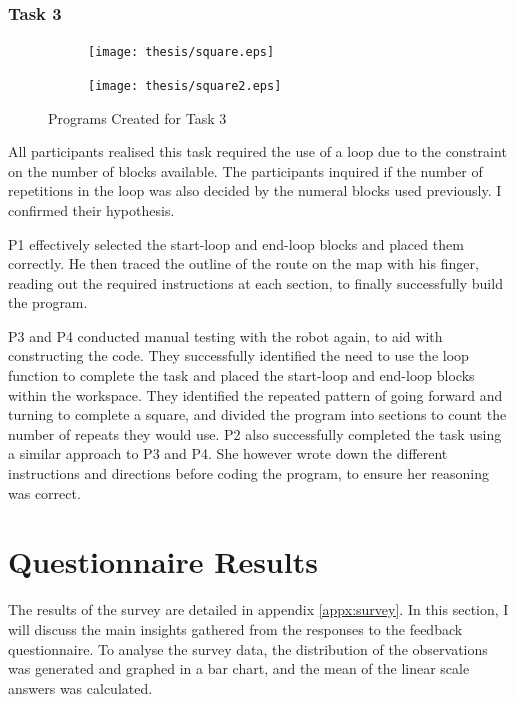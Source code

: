 \documentclass[oneside,%
                    author={Malak Hajji},
                    degree={BSc},
                    title={Designing An Accessible Computational Toolkit For Students},
                  subtitle={With Mixed Visual Abilities}]{dissertation}
\begin{document}
\subsubsection{Task 3}
\FloatBarrier

\begin{figure}[h]
\centering
\begin{subfigure}{.5\textwidth}
  \centering
  \texttt{[image: thesis/square.eps]}
  \label{fig-square}
\end{subfigure}%
\begin{subfigure}{.5\textwidth}
  \centering
  \texttt{[image: thesis/square2.eps]}
 
  \label{fig-square2}
\end{subfigure}
\caption{Programs Created for Task 3}
\label{fig-task3}
\end{figure}
\FloatBarrier
All participants realised this task required the use of a loop due to the constraint on the number of blocks available. The participants inquired if the number of repetitions in the loop was also decided by the numeral blocks used previously. I confirmed their hypothesis. 

P1 effectively selected the start-loop and end-loop blocks and placed them correctly. He then traced the outline of the route on the map with his finger, reading out the required instructions at each section, to finally successfully build the program.

P3 and P4 conducted manual testing with the robot again, to aid with constructing the code. They successfully identified the need to use the loop function to complete the task and placed the start-loop and end-loop blocks within the workspace. They identified the repeated pattern of going forward and turning to complete a square, and divided the program into sections to count the number of repeats they would use. 
P2 also successfully completed the task using a similar approach to P3 and P4. She however wrote down the different instructions and directions before coding the program, to ensure her reasoning was correct.


\section{Questionnaire Results}
The results of the survey are detailed in appendix \ref{appx:survey}. In this section, I will discuss the main insights gathered from the responses to the feedback questionnaire. To analyse the survey data, the distribution of the observations was generated and graphed in a bar chart, and the mean of the linear scale answers was calculated.
\end{document}

